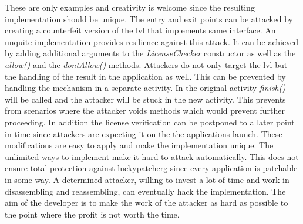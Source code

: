 These are only examples and creativity is welcome since the resulting implementation should be unique. \cite{developersSecuring}
\newline
The entry and exit points can be attacked by creating a counterfeit version of the \gls{lvl} that implements same interface.
An unquite implementation provides resilience against this attack.
It can be achieved by adding additional arguments to the \textit{LicenseChecker} constructor as well as the \textit{allow()} and the \textit{dontAllow()} methods. \cite{developersSecuring}
\newline
Attackers do not only target the \gls{lvl} but the handling of the result in the application as well.
This can be prevented by handling the mechanism in a separate activity.
In the original activity \textit{finish()} will be called and the attacker will be stuck in the new activity.
This prevents from scenarios where the attacker voids methods which would prevent further proceeding.
In addition the license verification can be postponed to a later point in time since attackers are expecting it on the the applications launch. \cite{developersSecuring}
\newline
These modifications are easy to apply and make the implementation unique.
The unlimited ways to implement make it hard to attack automatically.
This does not ensure total protection against \gls{luckypatcherg} since every application is patchable in some way.
A determined attacker, willing to invest a lot of time and work in disassembling and reassembling, can eventually hack the implementation.
The aim of the developer is to make the work of the attacker as hard as possible to the point where the profit is not worth the time. \cite{developersSecuring}
